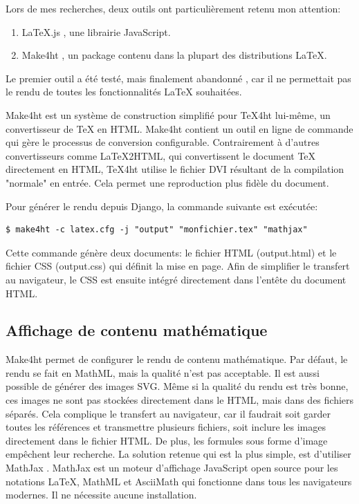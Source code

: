 \documentclass[12pt,titlepage,oneside]{article}
\renewcommand{\footnote}[1]{}
\renewcommand{\cite}[1]{}
\begin{document}
Lors de mes recherches, deux outils ont particulièrement retenu mon attention:
\begin{enumerate}
\item LaTeX.js \cite{latex.js}, une librairie JavaScript.
\item Make4ht \cite{make4ht}, un package contenu dans la plupart des distributions LaTeX.
\end{enumerate}
Le premier outil a été testé, mais finalement abandonné \footnote{voir \nameref{AlternativesConsidérées}}, car il ne permettait pas le rendu de toutes les fonctionnalités LaTeX souhaitées.\par
Make4ht est un système de construction simplifié pour TeX4ht \cite{tex4ht} lui-même, un convertisseur de TeX en HTML. Make4ht contient un outil en ligne de commande qui gère le processus de conversion configurable. Contrairement à d'autres convertisseurs comme LaTeX2HTML, qui convertissent le document TeX directement en HTML, TeX4ht utilise le fichier DVI \footnote{DeVice-Independent} résultant de la compilation "normale" en entrée. Cela permet une reproduction plus fidèle du document.\par

Pour générer le rendu depuis Django, la commande suivante est exécutée:
\begin{lstlisting}[style=MyHTML, caption = Ligne de commande pour le rendu]
$ make4ht -c latex.cfg -j "output" "monfichier.tex" "mathjax"
\end{lstlisting}
\vspace{-0.5cm}
Cette commande génère deux documents: le fichier HTML (output.html) et le fichier CSS (output.css) qui définit la mise en page. Afin de simplifier le transfert au navigateur, le CSS est ensuite intégré directement dans l'entête du document HTML.\par

\subsection{Affichage de contenu mathématique}
Make4ht permet de configurer le rendu de contenu mathématique. Par défaut, le rendu se fait en MathML, mais la qualité n'est pas acceptable. Il est aussi possible de générer des images SVG. Même si la qualité du rendu est très bonne, ces images ne sont pas stockées directement dans le HTML, mais dans des fichiers séparés. Cela complique le transfert au navigateur, car il faudrait soit garder toutes les références et transmettre plusieurs fichiers, soit inclure les images directement dans le fichier HTML. De plus, les formules sous forme d'image empêchent leur recherche. La solution retenue qui est la plus simple, est d'utiliser MathJax \cite{mathjax}. MathJax est un moteur d'affichage JavaScript open source pour les notations LaTeX, MathML et AsciiMath qui fonctionne dans tous les navigateurs modernes. Il ne nécessite aucune installation.\par
\end{document}
